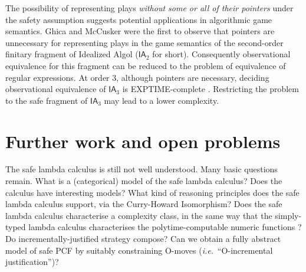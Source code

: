 \documentclass{llncs}
\newcommand\ialgol{\textsf{IA}}
\begin{document}
The possibility of representing plays \emph{without some or all of
  their pointers} under the safety assumption suggests potential
applications in algorithmic game semantics. Ghica and McCusker
\cite{ghicamccusker00} were the first to observe that pointers are
unnecessary for representing plays in the game semantics of the
second-order finitary fragment of Idealized Algol ($\ialgol_2$ for
short). Consequently observational equivalence for this fragment can
be reduced to the problem of equivalence of regular expressions.  At
order $3$, although pointers are necessary, deciding observational
equivalence of $\ialgol_3$ is EXPTIME-complete
\cite{DBLP:journals/apal/Ong04,DBLP:conf/fossacs/MurawskiW05}. Restricting
the problem to the safe fragment of $\ialgol_3$ may lead to a lower
complexity.





\section{Further work and open problems}

The safe lambda calculus is still not well understood. Many basic
questions remain. What is a (categorical) model of the safe lambda
calculus? Does the calculus have interesting models?  What kind of
reasoning principles does the safe lambda calculus support, via the
Curry-Howard Isomorphism? Does the safe lambda calculus characterise a
complexity class, in the same way that the simply-typed lambda
calculus characterises the polytime-computable numeric functions
\cite{DBLP:conf/tlca/LeivantM93}?  Do incrementally-justified strategy
compose? Can we obtain a fully abstract model of safe PCF by suitably
constraining O-moves ({\it i.e.}~``O-incremental justification'')?
\end{document}

